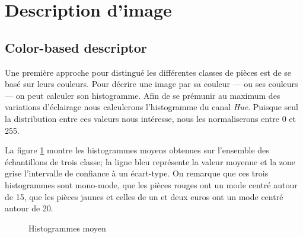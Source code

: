         

    \section{Description d'image}
    \label{imgDescriptors}
        \subsection{Color-based descriptor}
        Une première approche pour distingué les différentes classes de pièces est de se basé sur leurs couleurs.
        Pour décrire une image par sa couleur --- ou ses couleurs --- on peut calculer son histogramme. 
        Afin de se prémunir au maximum des variations d'éclairage nous calculerons l'histogramme du canal \emph{Hue}.
        Puisque seul la distribution entre ces valeurs nous intéresse, nous les normaliserons entre 0 et 255.
        
        La figure \ref{Hists} montre les histogrammes moyens obtenues sur l'ensemble des échantillons de trois classe; la ligne bleu représente la valeur moyenne et la zone grise l'intervalle de confiance à un écart-type.
        On remarque que ces trois histogrammes sont mono-mode, que les pièces rouges ont un mode centré autour de 15, que les pièces jaunes et celles de un et deux euros ont un mode centré autour de 20.
        
\begin{figure}[H]
    \centering
        \qquad
        \qquad
    \caption{Histogrammes moyen}
    \label{Hists}
\end{figure}
        
